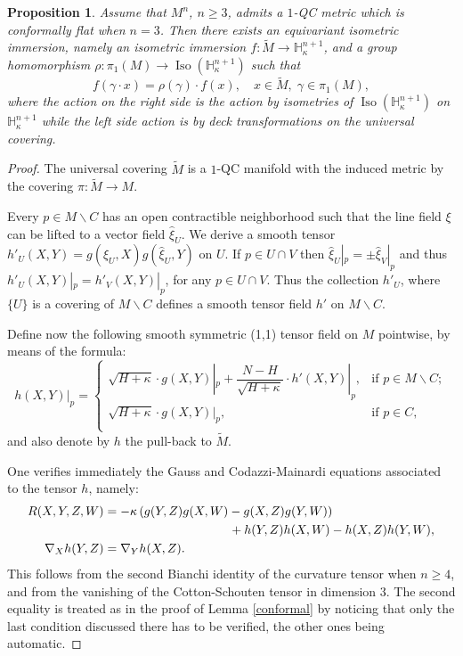 \documentclass[JEP,XML,SOM,Unicode]{cedram}
\let\moins\smallsetminus
\DeclareMathOperator{\Iso}{Iso}
\newtheorem{proposition}[theorem]{Proposition}
\theoremstyle{definition}
\theoremstyle{remark}
\numberwithin{equation}{section}
\begin{document}
\begin{proposition}\label{immerse}
Assume that $M^n$, $n\geq3$, admits a $1$-QC metric which is conformally flat when $n=3$.
Then there exists an equivariant
isometric immersion, namely an isometric immersion
$f:\widetilde{M}\to \mathbb H_{\kappa}^{n+1}$, and
a group homomorphism $\rho:\pi_1(M)\to \Iso(\mathbb H_{\kappa}^{n+1})$ such that
\[ f(\gamma\cdot x)=\rho(\gamma)\cdot f(x),\quad x\in \widetilde{M},\; \gamma \in \pi_1(M),\]
where the action on the right side is the action by isometries of
$\Iso(\mathbb H_{\kappa}^{n+1})$ on $\mathbb H_{\kappa}^{n+1}$ while the left side action is by
deck transformations on the universal covering.
\end{proposition}
\begin{proof}
The universal covering $\widetilde{M}$ is a
$1$-QC manifold with the induced metric by the covering $\pi:\widetilde{M}\to M$.

Every $p\in M\moins C$ has an open contractible neighborhood such that the line field $\xi$
can be lifted to a vector field $\widehat{\xi}_U$. We derive a smooth tensor
$h'_U(X,Y)=g(\widehat{\xi}_U,X)g(\widehat{\xi}_U,Y)$ on $U$. If $p\in U\cap V$ then
$\widehat{\xi}_U|_p=\pm \widehat{\xi}_V|_p$ and thus
$h'_U(X,Y)|_p=h'_V(X,Y)|_p$, for any $p\in U\cap V$. Thus the collection $h'_U$, where $\{U\}$
is a covering of $M\moins C$ defines a smooth tensor field $h'$ on $M\moins C$.

Define now the following smooth symmetric (1,1) tensor field on $M$ pointwise, by means of
the formula:
\[h(X,Y)|_p=\begin{cases}
\sqrt{H+\kappa}\cdot g(X,Y)|_p+ \dfrac{N-H}{\sqrt{H+\kappa}}\cdot h'(X,Y)|_p, &\text{if }p\in M\moins C; \\[3pt]
\sqrt{H+\kappa} \cdot g(X,Y)|_p, &\text{if }p\in C,
\\
\end{cases}
\]
and also denote by $h$ the pull-back to $\widetilde{M}$.

One verifies immediately the Gauss and Codazzi-Mainardi equations associated to the tensor $h$, namely:
\begin{align*}
R(X,Y,Z,W)&=-\kappa\left(g(Y,Z)g(X,W)-g(X,Z)g(Y,W)\right)\\
&\hspace*{3.55cm}+h(Y,Z)h(X,W)- h(X,Z)h(Y,W),\\
\nabla_Xh(Y,Z)&=\nabla_Yh(X,Z).
\end{align*}
This follows from the second Bianchi identity of the curvature tensor when
$n\geq4$, and from the vanishing of the Cotton-Schouten tensor
in dimension $3$. The second equality is treated as in
the proof of Lemma \ref{conformal} by noticing that only the last
condition discussed there has to be verified,
the other ones being automatic.


\end{proof}
\end{document}
